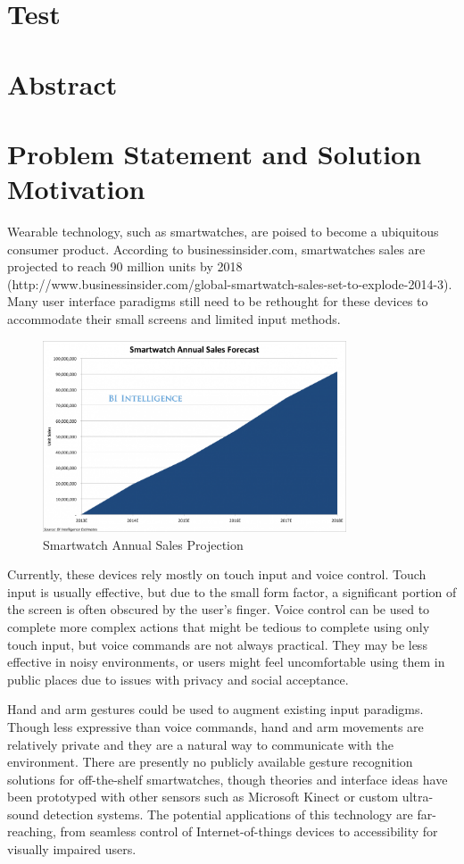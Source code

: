 \documentclass[]{article}
\author{}
\date{}
\begin{document}
\section{Test}\label{test}

\section{Abstract}

\section{Problem Statement and Solution Motivation}
Wearable technology, such as smartwatches, are poised to become a ubiquitous consumer product. According to businessinsider.com, smartwatches sales are projected to reach 90 million units by 2018 (http://www.businessinsider.com/global-smartwatch-sales-set-to-explode-2014-3). Many user interface paradigms still need to be rethought for these devices to accommodate their small screens and limited input methods. 

\begin{figure}[ht!]
  \centering
  \includegraphics[width=90mm]{smartwatch.png}
  \caption{Smartwatch Annual Sales Projection \label{overflow}}
\end{figure}

Currently, these devices rely mostly on touch input and voice control. Touch input is usually effective, but due to the small form factor, a significant portion of the screen is often obscured by the user's finger. Voice control can be used to complete more complex actions that might be tedious to complete using only touch input, but voice commands are not always practical. They may be less effective in noisy environments, or users might feel uncomfortable using them in public places due to issues with privacy and social acceptance.

Hand and arm gestures could be used to augment existing input paradigms. Though less expressive than voice commands, hand and arm movements are relatively private and they are a natural way to communicate with the environment. There are presently no publicly available gesture recognition solutions for off-the-shelf smartwatches, though theories and interface ideas have been prototyped with other sensors such as Microsoft Kinect or custom ultra-sound detection systems. The potential applications of this technology are far-reaching, from seamless control of Internet-of-things devices to accessibility for visually impaired users.
\end{document}
